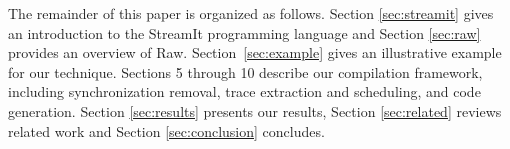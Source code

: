The remainder of this paper is organized as follows.  Section
\ref{sec:streamit} gives an introduction to the StreamIt programming
language and Section \ref{sec:raw} provides an overview of
Raw. Section~\ref{sec:example} gives an illustrative example for our
technique.  Sections 5 through 10 describe our compilation framework,
including synchronization removal, trace extraction and scheduling,
and code generation.  Section \ref{sec:results} presents our results,
Section \ref{sec:related} reviews related work and Section
\ref{sec:conclusion} concludes.




